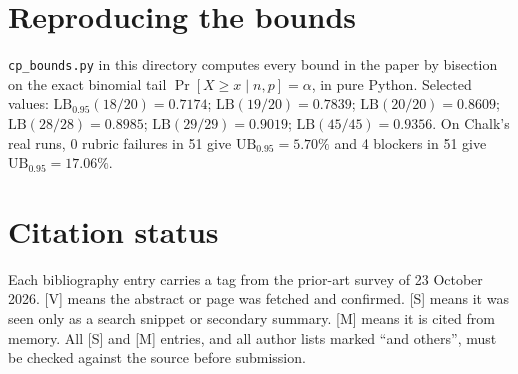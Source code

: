 \documentclass[11pt]{article}
\theoremstyle{remark}
\newcommand{\LB}{\mathrm{LB}}
\newcommand{\UB}{\mathrm{UB}}
\begin{document}



\appendix
\section{Reproducing the bounds}
\label{app:cp}

\texttt{cp\_bounds.py} in this directory computes every bound in the paper by bisection on the exact binomial tail $\Pr[X\ge x\mid n,p]=\alpha$, in pure Python. Selected values: $\LB_{0.95}(18/20)=0.7174$; $\LB(19/20)=0.7839$; $\LB(20/20)=0.8609$; $\LB(28/28)=0.8985$; $\LB(29/29)=0.9019$; $\LB(45/45)=0.9356$. On Chalk's real runs, 0 rubric failures in 51 give $\UB_{0.95}=5.70\%$ and 4 blockers in 51 give $\UB_{0.95}=17.06\%$.

\section{Citation status}
\label{app:cites}

Each bibliography entry carries a tag from the prior-art survey of 23 October 2026. [V] means the abstract or page was fetched and confirmed. [S] means it was seen only as a search snippet or secondary summary. [M] means it is cited from memory. All [S] and [M] entries, and all author lists marked ``and others'', must be checked against the source before submission.
\end{document}
